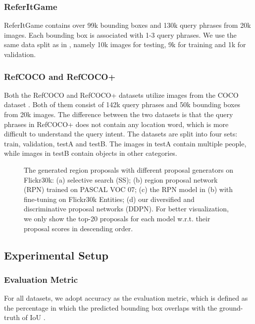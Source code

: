 \documentclass{article}
\begin{document}
\subsubsection{ReferItGame}
ReferItGame contains over 99k bounding boxes and 130k query phrases from 20k images. Each bounding box is associated with 1-3 query phrases. We use the same data split as in \cite{rohrbach2016grounding}, namely 10k images for testing, 9k for training and 1k for validation.

\subsubsection{RefCOCO and RefCOCO+}
Both the RefCOCO and RefCOCO+ datasets utilize images from the COCO dataset \cite{lin2014microsoft}. Both of them consist of 142k query phrases and 50k bounding boxes from 20k images. The difference between the two datasets is that the query phrases in RefCOCO+ does not contain any location word, which is more difficult to understand the query intent. The datasets are split into four sets: train, validation, testA and testB. The images in testA contain multiple people, while images in testB contain objects in other categories.
\begin{figure*}
\begin{center}
\vspace{-10pt}
\caption{The generated region proposals with different proposal generators on Flickr30k: (a) selective search (SS); (b) region proposal network (RPN) trained on PASCAL VOC 07; (c) the RPN model in (b) with fine-tuning on Flickr30k Entities; (d) our diversified and discriminative proposal networks (DDPN). For better visualization, we only show the top-20 proposals for each model w.r.t. their proposal scores in descending order. }
\label{fig:div_comparasion}
\end{center}
\vspace{-15pt}
\end{figure*}
\subsection{Experimental Setup}
\subsubsection{Evaluation Metric}
For all datasets, we adopt accuracy as the evaluation metric, which is defined as the percentage in which the predicted bounding box overlaps with the ground-truth of IoU .
\end{document}
